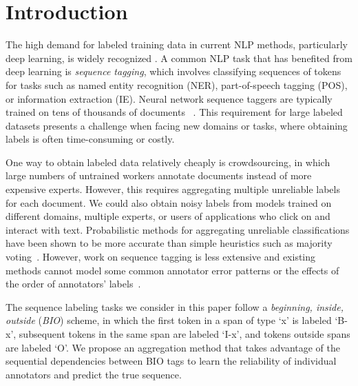 \section{Introduction}\label{sec:intro}

The high demand for labeled training data in current NLP methods,
particularly deep learning, is widely recognized
\cite{zoph2016transfer, rastogi2016weighting, P14-1111}.
A common NLP task that has benefited from deep learning is \emph{sequence tagging},
which involves classifying sequences of tokens for tasks such as named entity recognition (NER),
part-of-speech tagging (POS), or information extraction (IE). 
Neural network sequence taggers are typically trained on 
tens of thousands of documents %
~\cite{ma2016end,lample2016neural}.
This requirement for large labeled datasets presents a challenge 
when facing new domains or tasks, where obtaining labels is often time-consuming or costly.

One way to obtain labeled data relatively cheaply is crowdsourcing, in which large
numbers of untrained workers annotate documents instead of more expensive experts.
However, this requires aggregating multiple unreliable labels for each document.
We could also obtain noisy labels from models trained on different domains,  
 multiple experts, or users of applications who click on and interact
with text.
Probabilistic methods for aggregating unreliable classifications 
have been shown to be more accurate than simple heuristics 
such as majority voting~\cite{Raykar2010,sheshadri2013square,rodrigues2013learning,hovy2013learning}.
However, work on sequence tagging is less extensive 
and existing methods cannot model some common annotator error patterns or
the effects of the order of annotators' labels~\cite{rodrigues2014sequence,nguyen2017aggregating}.

The sequence labeling tasks we consider in this paper follow a \emph{beginning, inside, outside} (\emph{BIO})
 scheme, 
in which the first token in a span of type `x' is labeled `B-x',  
subsequent tokens in the same span are labeled `I-x', 
and tokens outside spans are labeled `O'.
We propose an aggregation method that takes advantage of the sequential dependencies between BIO tags
to learn the reliability of individual annotators and predict the true sequence.


